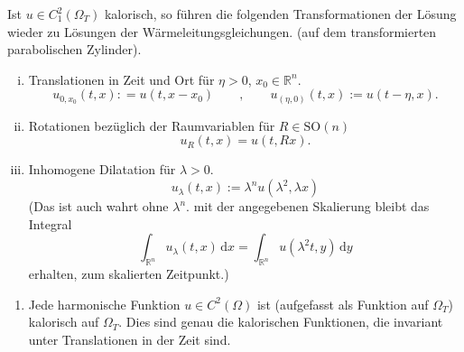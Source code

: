 \begin{bemerkung}
	Ist $u \in C_1^2(\Omega_T)$ kalorisch, so führen die folgenden Transformationen der Lösung wieder zu Lösungen der Wärmeleitungsgleichungen. 
	(auf dem transformierten parabolischen Zylinder). 
	\begin{enumerate}[(i)]
		\item Translationen in Zeit und Ort für $\eta >0$, $x_0 \in \mathbb{R}^n$.
		\[
			u_{0,x_0}(t,x): = u(t,x-x_0) \qquad , \qquad u_{(\eta,0)}(t,x) := u(t-\eta,x).
		\]
		\item Rotationen bezüglich der Raumvariablen für $R \in \text{SO}(n)$
		\[
			u_R(t,x) = u(t,Rx).
		\]
		\item Inhomogene Dilatation für $\lambda >0$.
		\[
			u_{\lambda}(t,x) := \lambda^n u ( \lambda^2, \lambda x)
		\]
		(Das ist auch wahrt ohne $\lambda^n$. mit der angegebenen Skalierung bleibt das Integral
		\[
			\int_{\mathbb{R}^n}^{} u _{\lambda}(t,x) \,\mathrm{d}x = \int_{\mathbb{R}^n}^{} u(\lambda^2t,y) \,\mathrm{d}y
		\] erhalten, zum skalierten Zeitpunkt.)
	\end{enumerate}
\end{bemerkung}

\begin{beispiele}
	\begin{enumerate}[1)]
		\item Jede harmonische Funktion $u \in C^2(\Omega)$ ist (aufgefasst als Funktion auf $\Omega_T$) kalorisch auf $\Omega_T$. 
		Dies sind genau die kalorischen Funktionen, die invariant unter Translationen in der Zeit sind.
		
	\end{enumerate}
\end{beispiele}

\cleardoubleoddemptypage
{}
\setcounter{page}{1}

